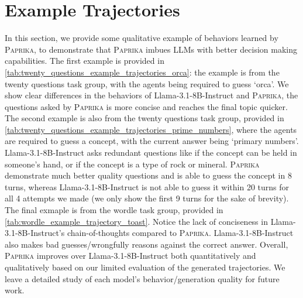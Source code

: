 \documentclass{article}
\newcommand{\ours}[1]{\textsc{Paprika}}
\theoremstyle{plain}
\theoremstyle{definition}
\theoremstyle{remark}
\begin{document}
\section{Example Trajectories} \label{appendixSection:example_trajectories}
In this section, we provide some qualitative example of behaviors learned by \ours{}, to demonstrate that \ours{} imbues LLMs with better decision making capabilities.
The first example is provided in \cref{tab:twenty_questions_example_trajectories_orca}: the example is from the twenty questions task group, with the agents being required to guess `orca'. We show clear differences in the behaviors of Llama-3.1-8B-Instruct and \ours{}, the questions asked by \ours{} is more concise and reaches the final topic quicker.
The second example is also from the twenty questions task group, provided in \cref{tab:twenty_questions_example_trajectories_prime_numbers}, where the agents are required to guess a concept, with the current answer being `primary numbers'. Llama-3.1-8B-Instruct asks redundant questions like if the concept can be held in someone's hand, or if the concept is a type of rock or mineral. \ours{} demonstrate much better quality questions and is able to guess the concept in 8 turns, whereas Llama-3.1-8B-Instruct is not able to guess it within 20 turns for all 4 attempts we made (we only show the first 9 turns for the sake of brevity).
The final exmaple is from the wordle task group, provided in \cref{tab:wordle_example_trajectory_toast}. Notice the lack of conciseness in Llama-3.1-8B-Instruct's chain-of-thoughts compared to \ours{}. Llama-3.1-8B-Instruct also makes bad guesses/wrongfully reasons against the correct answer.
Overall, \ours{} improves over Llama-3.1-8B-Instruct both quantitatively and qualitatively based on our limited evaluation of the generated trajectories. We leave a detailed study of each model's behavior/generation quality for future work.
\newpage
\end{document}
